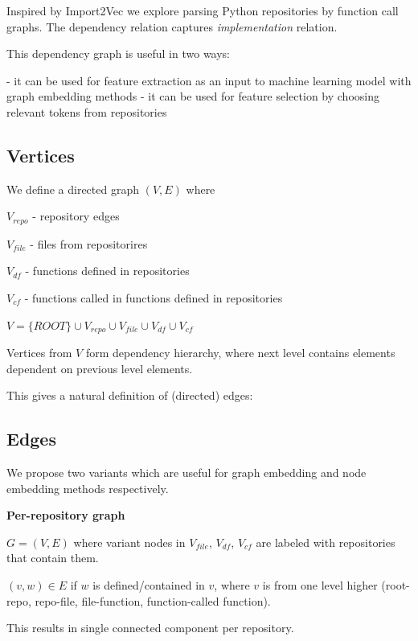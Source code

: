 \documentclass[longabstract,mgr,english]{iithesis}
\begin{document}
Inspired by Import2Vec we explore parsing Python repositories by function call graphs. The dependency relation captures \textit{implementation} relation.

This dependency graph is useful in two ways:

- it can be used for feature extraction as an input to machine learning model with graph embedding methods
- it can be used for feature selection by choosing relevant tokens from repositories

\subsection{Vertices}

We define a directed graph  \((V, E)\) where 



\(V_{repo}\) - repository edges



\(V_{file}\) - files from repositorires 



\(V_{df}\) - functions defined in repositories



\(V_{cf}\) - functions called in functions defined in repositories



\(V = \{ROOT\} \cup V_{repo} \cup V_{file} \cup V_{df} \cup V_{cf}\)



Vertices from \(V\) form dependency hierarchy, where next level contains elements dependent on previous level elements.

This gives a natural definition of (directed) edges:


\subsection{Edges}

We propose two variants which are useful for graph embedding and node embedding methods respectively.

\textbf{Per-repository graph}

$G = (V, E)$ where variant nodes in $V_{file}$, $V_{df}$, $V_{cf}$ are labeled with repositories that contain them.

\((v, w) \in E\) if \(w\) is defined/contained in \(v\), where \(v\) is from one level higher (root-repo, repo-file, file-function, function-called function).

This results in single connected component per repository.
\end{document}
